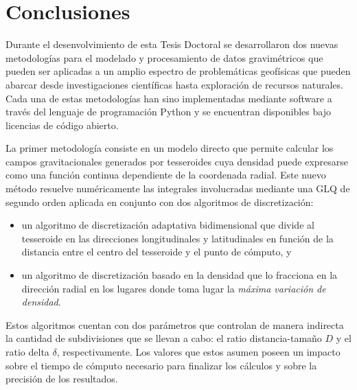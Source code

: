 \chapter{Conclusiones}








Durante el desenvolvimiento de esta Tesis Doctoral se desarrollaron dos nuevas
metodologías para el modelado y procesamiento de datos gravimétricos que pueden
ser aplicadas a un amplio espectro de problemáticas geofísicas que pueden
abarcar desde investigaciones científicas hasta exploración de recursos
naturales.
Cada una de estas metodologías han sino implementadas mediante software
a través del lenguaje de programación Python y se encuentran disponibles bajo
licencias de código abierto.

\vspace{1em}

La primer metodología consiste en un modelo directo que permite calcular los
campos gravitacionales generados por tesseroides cuya densidad puede expresarse
como una función continua dependiente de la coordenada radial.
Este nuevo método resuelve numéricamente las integrales involucradas mediante
una \acl{GLQ} de segundo orden aplicada en conjunto con dos algoritmos de
discretización:

\begin{itemize}
    \item un algoritmo de discretización adaptativa bidimensional que divide al
        tesseroide en las direcciones longitudinales y latitudinales en función
        de la distancia entre el centro del tesseroide y el punto de cómputo, y
    \item  un algoritmo de discretización basado en la densidad que lo
        fracciona en la dirección radial en los lugares donde toma lugar la
        \emph{máxima variación de densidad}.
\end{itemize}

Estos algoritmos cuentan con dos parámetros que controlan de manera indirecta
la cantidad de subdivisiones que se llevan a cabo: el ratio distancia-tamaño
$D$ y el ratio delta $\delta$, respectivamente.
Los valores que estos asumen poseen un impacto sobre el tiempo de cómputo
necesario para finalizar los cálculos y sobre la precisión de los resultados.


